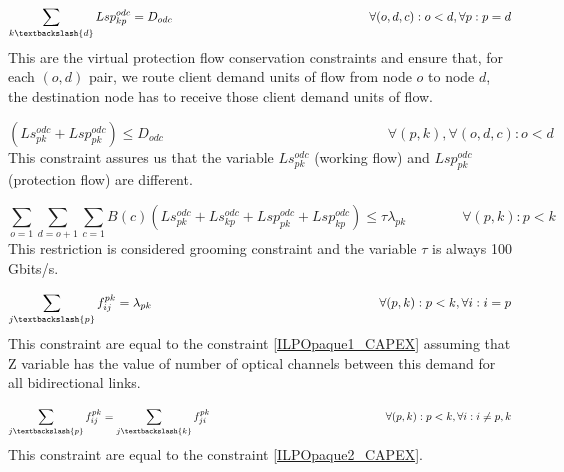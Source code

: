 \begin{equation}
\sum_{k\textbackslash \{d\}} Lsp_{kp}^{odc} = D_{odc} \qquad \qquad \qquad \qquad \qquad \qquad \qquad \qquad
\forall(o,d,c) : o < d, \forall p: p = d
\label{ILPTranslucp3p}
\end{equation}
\noindent
This are the virtual protection flow conservation constraints and ensure that, for each $(o,d)$ pair, we route client demand units of flow from node $o$ to node $d$, the destination node has to receive those client demand units of flow.

\begin{equation}
(Ls_{pk}^{odc} + Lsp_{pk}^{odc}) \leq D_{odc} \qquad \qquad \qquad \qquad \qquad \qquad \qquad \qquad
\forall (p,k), \forall(o,d,c) : o < d
\label{ILPTranslucpX}
\end{equation}
\noindent
This constraint assures us that the variable $Ls_{pk}^{odc}$ (working flow) and $Lsp_{pk}^{odc}$ (protection flow) are different.

\begin{equation}
\sum_{o=1} \sum_{d=o+1} \sum_{c=1} B(c)(Ls_{pk}^{odc} + Ls_{kp}^{odc} + Lsp_{pk}^{odc} + Lsp_{kp}^{odc}) \leq  \tau \lambda_{pk} \qquad \qquad
\forall (p,k) : p < k
\label{ILPTranslucp4}
\end{equation}
\noindent
This restriction is considered grooming constraint and the variable $\tau$ is always 100 Gbits/s.

\begin{equation}
\sum_{j\textbackslash \{p\}} f_{ij}^{pk} = \lambda_{pk}  \qquad \qquad \qquad \qquad \qquad \qquad \qquad \qquad \qquad
\forall(p,k) : p < k, \forall i: i = p
\label{ILPTranslucp6}
\end{equation}
\noindent
This constraint are equal to the constraint \ref{ILPOpaque1_CAPEX} assuming that Z variable has the value of number of optical channels between this demand for all bidirectional links.

\begin{equation}
\sum_{j\textbackslash \{p\}} f_{ij}^{pk} = \sum_{j\textbackslash \{k\}} f_{ji}^{pk} \qquad \qquad \qquad \qquad \qquad \qquad \qquad \qquad
\forall(p,k) : p < k, \forall i: i \neq p,k
\label{ILPTranslucp7}
\end{equation}
\noindent
This constraint are equal to the constraint \ref{ILPOpaque2_CAPEX}.

